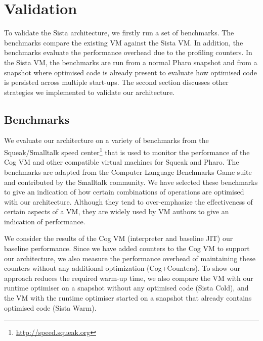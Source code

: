 \documentclass[a4paper,12pt,twoside]{../includes/ThesisStyle}
\begin{document}
\fi

\chapter{Validation}
\label{chap:validation}
\minitoc

To validate the Sista architecture, we firstly run a set of benchmarks. The benchmarks compare the existing VM against the Sista VM. In addition, the benchmarks evaluate the performance overhead due to the profiling counters. In the Sista VM, the benchmarks are run from a normal Pharo snapshot and from a snapshot where optimised code is already present to evaluate how optimised code is persisted across multiple start-ups. The second section discusses other strategies we implemented to validate our architecture.

\section{Benchmarks}


We evaluate our architecture on a variety of benchmarks from the Squeak/Smalltalk speed center\footnote{\url{http://speed.squeak.org}} that is used to monitor the performance of the Cog VM and other compatible virtual machines for Squeak and Pharo. The benchmarks are adapted from the Computer Language Benchmarks Game suite \cite{GameBenchs} and contributed by the Smalltalk community. We have selected these benchmarks to give an indication of how certain combinations of operations are optimised with our architecture. Although they tend to over-emphasize the effectiveness of certain aspects of a VM, they are widely used by VM authors to give an indication of performance.

We consider the results of the Cog VM (interpreter and baseline JIT) our baseline performance. Since we have added counters to the Cog VM to support our architecture, we also measure the performance overhead of maintaining these counters without any additional optimization (Cog+Counters). To show our approach reduces the required warm-up time, we also compare the VM with our runtime optimiser on a snapshot without any optimised code (Sista Cold), and the VM with the runtime optimiser started on a snapshot that already contains optimised code (Sista Warm).
\end{document}
